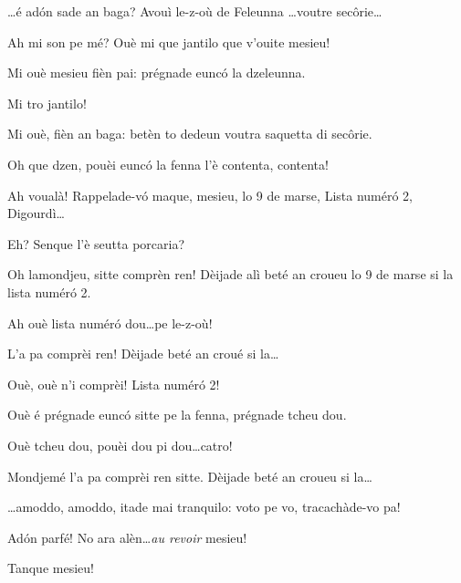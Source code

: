 \begin{drama}
\Cimaspeaks \ldots é ad\'on sade an baga? Avouì le-z-où de Feleunna \ldots  voutre sec\^orie\ldots 

\Pompiolenspeaks Ah mi son pe mé? Ouè mi que jantilo que v'ouite mesieu!

\Marcospeaks {} Mi ouè mesieu fièn pai: prégnade eunc\'o la dzeleunna.

\Pompiolenspeaks Mi tro jantilo! 

\Cimaspeaks Mi ouè, fièn an baga: betèn to dedeun  voutra saquetta di sec\^orie.


\Pompiolenspeaks Oh que dzen, pouèi eunc\'o la fenna l'è contenta, contenta!

\Cimaspeaks Ah voualà!  Rappelade-v\'o maque, mesieu, lo 9 de marse, Lista num\'er\'o 2, Digourdì\ldots

\Pompiolenspeaks Eh? Senque l'è seutta porcaria?

\Cimaspeaks {} Oh lamondjeu, sitte comprèn ren!  Dèijade alì beté an croueu lo 9 de marse si la lista num\'er\'o 2.

\Pompiolenspeaks Ah ouè lista num\'er\'o dou\ldots pe le-z-où!

\Cimaspeaks {} L'a pa comprèi ren!  Dèijade beté an croué si la\ldots

\Pompiolenspeaks {} Ouè, ouè n'i comprèi! Lista num\'er\'o 2!


\Cimaspeaks Ouè é prégnade eunc\'o sitte pe la fenna, prégnade tcheu dou.

\Pompiolenspeaks{} Ouè tcheu dou, pouèi dou pi dou\ldots catro!

\Cimaspeaks {} Mondjemé l'a pa comprèi ren sitte.  Dèijade beté an croueu si la\ldots

\Pompiolenspeaks \ldots amoddo, amoddo, itade mai tranquilo: voto pe vo, tra\-ca\-chà\-de-vo pa!

\Marcospeaks Ad\'on parfé! No ara alèn\ldots \textit{au revoir} mesieu!

\Cimaspeaks Tanque mesieu!



\end{drama}
